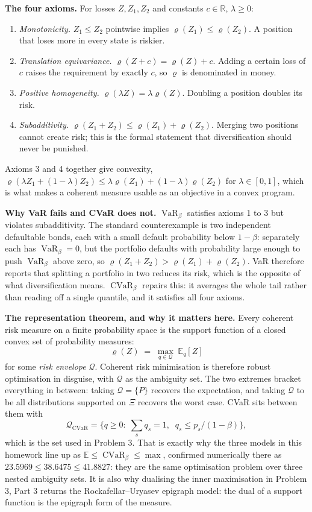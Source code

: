 \documentclass[11pt]{article}
\DeclareMathOperator{\CVaR}{CVaR}
\DeclareMathOperator{\VaR}{VaR}
\theoremstyle{definition}
\begin{document}
\textbf{The four axioms.} For losses $Z, Z_1, Z_2$ and constants
$c \in \mathbb{R}$, $\lambda \ge 0$:
\begin{enumerate}
  \item \emph{Monotonicity.} $Z_1 \le Z_2$ pointwise implies
    $\varrho(Z_1) \le \varrho(Z_2)$. A position that loses more in every
    state is riskier.
  \item \emph{Translation equivariance.} $\varrho(Z+c) = \varrho(Z)+c$.
    Adding a certain loss of $c$ raises the requirement by exactly $c$,
    so $\varrho$ is denominated in money.
  \item \emph{Positive homogeneity.} $\varrho(\lambda Z) =
    \lambda\varrho(Z)$. Doubling a position doubles its risk.
  \item \emph{Subadditivity.} $\varrho(Z_1+Z_2) \le \varrho(Z_1) +
    \varrho(Z_2)$. Merging two positions cannot create risk; this is the
    formal statement that diversification should never be punished.
\end{enumerate}
Axioms 3 and 4 together give convexity,
$\varrho(\lambda Z_1 + (1-\lambda)Z_2) \le \lambda\varrho(Z_1) +
(1-\lambda)\varrho(Z_2)$ for $\lambda \in [0,1]$, which is what makes a
coherent measure usable as an objective in a convex program.

\textbf{Why VaR fails and CVaR does not.} $\VaR_\beta$ satisfies axioms 1
to 3 but violates subadditivity. The standard counterexample is two
independent defaultable bonds, each with a small default probability
below $1-\beta$: separately each has $\VaR_\beta = 0$, but the
portfolio defaults with probability large enough to push $\VaR_\beta$
above zero, so $\varrho(Z_1+Z_2) > \varrho(Z_1)+\varrho(Z_2)$. VaR
therefore reports that splitting a portfolio in two reduces its risk,
which is the opposite of what diversification means. $\CVaR_\beta$ repairs
this: it averages the whole tail rather than reading off a single
quantile, and it satisfies all four axioms.

\textbf{The representation theorem, and why it matters here.} Every
coherent risk measure on a finite probability space is the support
function of a closed convex set of probability measures:
\[
  \varrho(Z) \;=\; \max_{q \in \mathcal{Q}} \; \mathbb{E}_{q}[Z]
\]
for some \emph{risk envelope} $\mathcal{Q}$. Coherent risk minimisation is
therefore robust optimisation in disguise, with $\mathcal{Q}$ as the
ambiguity set. The two extremes bracket everything in between: taking
$\mathcal{Q} = \{P\}$ recovers the expectation, and taking $\mathcal{Q}$
to be all distributions supported on $\Xi$ recovers the worst case. CVaR
sits between them with
\[
  \mathcal{Q}_{\CVaR} = \Big\{ q \ge 0 :\;
    \textstyle\sum_s q_s = 1,\;\; q_s \le p_s/(1-\beta) \Big\},
\]
which is the set used in Problem 3. That is exactly why the three models
in this homework line up as
$\mathbb{E} \le \CVaR_\beta \le \max$, confirmed numerically there as
$23.5969 \le 38.6475 \le 41.8827$: they are the same optimisation problem
over three nested ambiguity sets. It is also why dualising the inner
maximisation in Problem 3, Part 3 returns the Rockafellar--Uryasev epigraph
model: the dual of a support function is the epigraph form of the measure.
\end{document}
